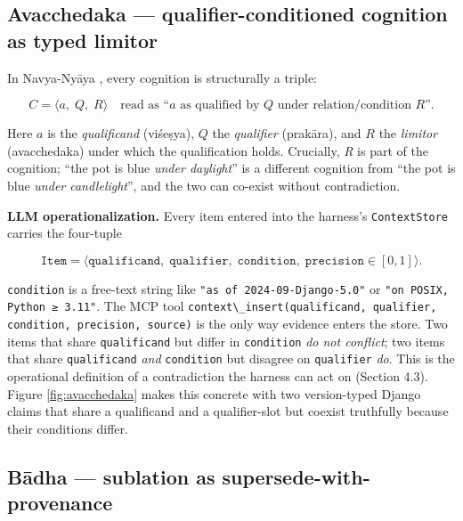 \subsection{Avacchedaka --- qualifier-conditioned cognition as typed limitor}\label{avacchedaka-qualifier-conditioned-cognition-as-typed-limitor}

In Navya-Nyāya \citep{matilal1968navyanyaya, ingalls1951materials, gangesa14tattvacintamani, phillips2012epistemology}, every cognition is structurally a triple:

\[
C = \langle a,\; Q,\; R \rangle \quad\text{read as ``}a\text{ as qualified by }Q\text{ under relation/condition }R\text{''.}
\]

Here \(a\) is the \emph{qualificand} (viśeṣya), \(Q\) the \emph{qualifier} (prakāra), and \(R\) the \emph{limitor} (avacchedaka) under which the qualification holds. Crucially, \emph{R} is part of the cognition; ``the pot is blue \emph{under daylight}'' is a different cognition from ``the pot is blue \emph{under candlelight}'', and the two can co-exist without contradiction.

\textbf{LLM operationalization.} Every item entered into the harness's \passthrough{\lstinline!ContextStore!} carries the four-tuple

\[
\texttt{Item} = \big\langle \texttt{qualificand},\; \texttt{qualifier},\; \texttt{condition},\; \texttt{precision}\in[0,1] \big\rangle.
\]

\passthrough{\lstinline!condition!} is a free-text string like \passthrough{\lstinline!"as of 2024-09-Django-5.0"!} or \passthrough{\lstinline!"on POSIX, Python ≥ 3.11"!}. The MCP tool \passthrough{\lstinline!context\_insert(qualificand, qualifier, condition, precision, source)!} is the only way evidence enters the store. Two items that share \passthrough{\lstinline!qualificand!} but differ in \passthrough{\lstinline!condition!} \emph{do not conflict}; two items that share \passthrough{\lstinline!qualificand!} \emph{and} \passthrough{\lstinline!condition!} but disagree on \passthrough{\lstinline!qualifier!} \emph{do}. This is the operational definition of a contradiction the harness can act on (Section 4.3). Figure \ref{fig:avacchedaka} makes this concrete with two version-typed Django claims that share a qualificand and a qualifier-slot but coexist truthfully because their conditions differ.



\subsection{Bādha --- sublation as supersede-with-provenance}\label{bux101dha-sublation-as-supersede-with-provenance}

